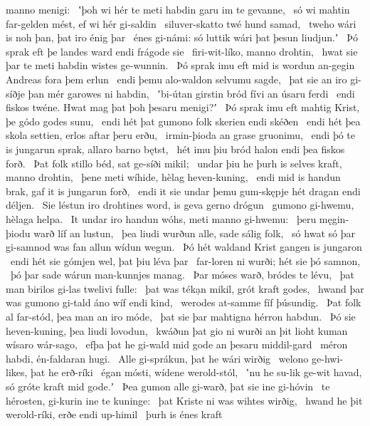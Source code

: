 manno menigi: \hld\ ʽþoh wi hér te meti habdin
garu im te gevanne, \hld\ só wi mahtin far-gelden mést,
ef wi hér gi-saldin \hld\ siluver-skatto
twé hund samad, \hld\ tweho wári is noh þan,
þat iro énig þar \hld\ énes gi-námi:
só luttik wári þat þesun liudjun.ʼ \hld\ Þó sprak eft þe landes ward
endi frágode sie \hld\ firi-wit-líko,
manno drohtin, \hld\ hwat sie þar te meti habdin
wistes ge-wunnin. \hld\ Þó sprak imu eft mid is wordun an-gegin
Andreas fora þem erlun \hld\ endi þemu alo-waldon
selvumu sagde, \hld\ þat sie an iro gi-síðje þan mér
garowes ni habdin, \hld\ ʽbi-útan girstin bród
fívi an úsaru ferdi \hld\ endi fiskos twéne.
Hwat mag þat þoh þesaru menigi?ʼ \hld\ Þó sprak imu eft mahtig Krist,
þe gódo godes sunu, \hld\ endi hét þat gumono folk
skerien endi skéðen \hld\ endi hét þea skola settien,
erlos aftar þeru erðu, \hld\ irmin-þioda
an grase gruonimu, \hld\ endi þó te is jungarun sprak,
allaro barno bętst, \hld\ hét imu þiu bród halon
endi þea fiskos forð. \hld\ Þat folk stillo béd,
sat ge-síði mikil; \hld\ undar þiu he þurh is selves kraft,
manno drohtin, \hld\ þene meti wíhide,
hèlag heven-kuning, \hld\ endi mid is handun brak,
gaf it is jungarun forð, \hld\ endi it sie undar þemu gum-skępje hét
dragan endi déljen. \hld\ Sie léstun iro drohtines word,
is geva gerno drógun \hld\ gumono gi-hwemu,
hèlaga helpa. \hld\ It undar iro handun wóhs,
meti manno gi-hwemu: \hld\ þeru męgin-þiodu warð
líf an lustun, \hld\ þea liudi wurðun alle,
sade sálig folk, \hld\ só hwat só þar gi-samnod was
fan allun wídun wegun. \hld\ Þó hét waldand Krist
gangen is jungaron \hld\ endi hét sie gómjen wel,
þat þiu léva þar \hld\ far-loren ni wurði;
hét sie þó samnon, \hld\ þó þar sade wárun
man-kunnjes manag. \hld\ Þar móses warð,
bródes te lévu, \hld\ þat man birilos gi-las
twelivi fulle: \hld\ þat was tékạn mikil,
grót kraft godes, \hld\ hwand þar was gumono gi-tald
áno wíf endi kind, \hld\ werodes at-samme
fíf þúsundig. \hld\ Þat folk al far-stód,
þea man an iro móde, \hld\ þat sie þar mahtigna
hérron habdun. \hld\ Þó sie heven-kuning,
þea liudi lovodun, \hld\ kwáðun þat gio ni wurði an þit lioht kuman
wísaro wár-sago, \hld\ efþa þat he gi-wald mid gode
an þesaru middil-gard \hld\ méron habdi,
én-faldaran hugi. \hld\ Alle gi-sprákun,
þat he wári wirðig \hld\ welono ge-hwi-likes,
þat he erð-ríki \hld\ égan mósti,
wídene werold-stól, \hld\ ʽnu he su-lik ge-wit havad,
só gróte kraft mid gode.ʼ \hld\ Þea gumon alle gi-warð,
þat sie ine gi-hóvin \hld\ te hérosten,
gi-kurin ine te kuninge: \hld\ þat Kriste ni was
wihtes wirðig, \hld\ hwand he þit werold-ríki,
erðe endi up-himil \hld\ þurh is énes kraft

